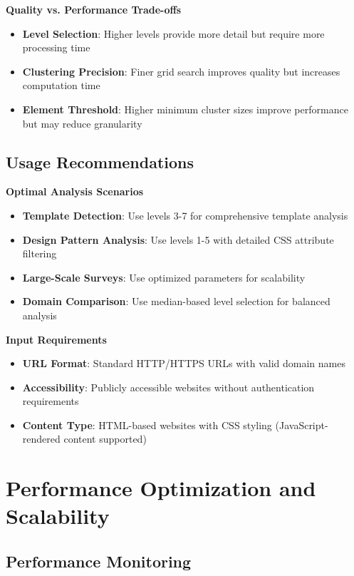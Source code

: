 \textbf{Quality vs. Performance Trade-offs}
\begin{itemize}
    \item \textbf{Level Selection}: Higher levels provide more detail but require more processing time
    \item \textbf{Clustering Precision}: Finer grid search improves quality but increases computation time
    \item \textbf{Element Threshold}: Higher minimum cluster sizes improve performance but may reduce granularity
\end{itemize}

\subsection{Usage Recommendations}
\label{subsec:usage-recommendations}

\textbf{Optimal Analysis Scenarios}
\begin{itemize}
    \item \textbf{Template Detection}: Use levels 3-7 for comprehensive template analysis
    \item \textbf{Design Pattern Analysis}: Use levels 1-5 with detailed CSS attribute filtering
    \item \textbf{Large-Scale Surveys}: Use optimized parameters for scalability
    \item \textbf{Domain Comparison}: Use median-based level selection for balanced analysis
\end{itemize}

\textbf{Input Requirements}
\begin{itemize}
    \item \textbf{URL Format}: Standard HTTP/HTTPS URLs with valid domain names
    \item \textbf{Accessibility}: Publicly accessible websites without authentication requirements
    \item \textbf{Content Type}: HTML-based websites with CSS styling (JavaScript-rendered content supported)
\end{itemize}

\section{Performance Optimization and Scalability}
\label{sec:performance-optimization}

\subsection{Performance Monitoring}
\label{subsec:performance-monitoring}

